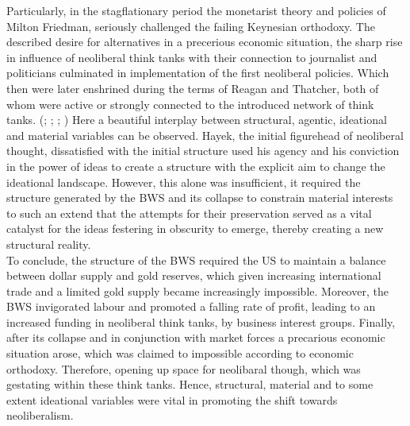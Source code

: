 \documentclass[11pt]{article}
\begin{document}
Particularly, in the stagflationary period the monetarist theory and policies of Milton Friedman, seriously challenged the failing Keynesian orthodoxy. The described desire for alternatives in a precerious economic situation, the sharp rise in influence of neoliberal think tanks with their connection to journalist and politicians culminated in implementation of the first neoliberal policies. Which then were later enshrined during the terms of Reagan and Thatcher, both of whom were active or strongly connected to the introduced network of think tanks.
(\cite[p.~223-228]{BeaudMichel1983Ahoc}; \cite[p.~63-69/77-80]{KotzDavidMDavidMichael2015Traf}; \cite[p.~ix]{1977TEot}; \cite[p.~173-174/210-211/254]{JonesDanielStedman2014Motu})
Here a beautiful interplay between structural, agentic, ideational and material variables 
can be observed. Hayek, the initial figurehead of neoliberal thought, dissatisfied with the initial structure used his agency and his conviction in the power of ideas to create a structure with the explicit aim to change the ideational landscape. However, this alone was insufficient, it required the structure generated by the BWS and its collapse to constrain material interests to such an extend that the attempts for their preservation served as a vital catalyst for the ideas festering in obscurity to emerge, thereby creating a new structural reality. \\

To conclude, the structure of the BWS required the US to maintain a balance between dollar supply and gold reserves, which given increasing international trade and a limited gold supply became increasingly impossible. Moreover, the BWS invigorated labour and promoted a falling rate of profit, leading to an increased funding in neoliberal think tanks, by business interest groups. Finally, after its collapse and in conjunction with market forces a precarious economic situation arose, which was claimed to impossible according to economic orthodoxy. Therefore, opening up space for neolibaral though, which was gestating within these think tanks. Hence, structural, material and to some extent ideational variables were vital in promoting the shift towards neoliberalism.



\end{document}
